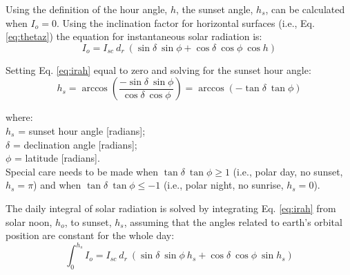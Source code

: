 Using the definition of the hour angle, $h$, the sunset angle, $h_s$, can be calculated when $I_o = 0$. 
Using the inclination factor for horizontal surfaces (i.e., Eq. \ref{eq:thetaz}) the equation for instantaneous solar radiation is:
\begin{equation}
\label{eq:irah}
	I_o = I_{sc}\: d_r\: \left( \sin\delta\: \sin\phi + 
	      \cos\delta\: \cos\phi\: \cos h \right)
\end{equation}

\noindent Setting Eq. \ref{eq:irah} equal to zero and solving for the sunset hour angle:
\begin{equation}
\label{eq:hs}
	h_s  = \arccos\left(\frac{-\sin\delta\: \sin\phi}
		                          {\cos\delta\: \cos\phi}\right)
		 = \arccos\left(-\tan\delta\: \tan\phi\right)
\end{equation}

\noindent where:\\
\indent $h_s$ = sunset hour angle [radians];\\
\indent $\delta$ = declination angle [radians];\\
\indent $\phi$ = latitude [radians].\\

\noindent Special care needs to be made when $\tan\delta\:\tan\phi \geq 1$ (i.e., polar day, no sunset, $h_s = \pi$) and when $\tan\delta\:\tan\phi \leq -1$ (i.e., polar night, no sunrise, $h_s = 0$).

The daily integral of solar radiation is solved by integrating Eq. \ref{eq:irah} from solar noon, $h_o$, to sunset, $h_s$, assuming that the angles related to earth's orbital position are constant for the whole day:
\begin{equation}
\label{eq:intrahs}
	\int_0^{h_s} I_o = I_{sc}\: d_r\: \left( 
	      \sin\delta\: \sin\phi\: h_s + 
	      \cos\delta\: \cos\phi\: \sin h_s \right)
\end{equation}

